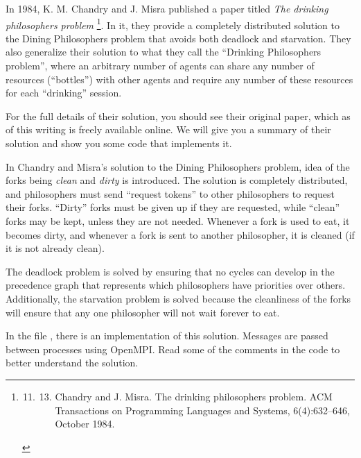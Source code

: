 \documentclass[letterpaper,10pt,openany,oneside]{sphinxmanual}
\begin{document}
In 1984, K. M. Chandry and J. Misra published a paper titled
\emph{The drinking philosophers problem} \footnote{\begin{enumerate}
\setcounter{enumi}{10}
\item {} \begin{enumerate}
\setcounter{enumi}{12}
\item {} 
Chandry and J. Misra. The drinking philosophers problem. ACM Transactions on Programming Languages and Systems, 6(4):632–646, October 1984.

\end{enumerate}

\end{enumerate}
}. In it, they
provide a completely distributed solution to the Dining
Philosophers problem that avoids both deadlock and starvation. They
also generalize their solution to what they call the
``Drinking Philosophers problem'', where an arbitrary number of
agents can share any number of resources (``bottles'') with other
agents and require any number of these resources for each
``drinking'' session.

For the full details of their solution, you should see their
original paper, which as of this writing is freely available
online. We will give you a summary of their solution and show you
some code that implements it.

In Chandry and Misra's solution to the Dining Philosophers problem,
idea of the forks being \emph{clean} and \emph{dirty} is introduced. The
solution is completely distributed, and philosophers must send
``request tokens'' to other philosophers to request their forks.
``Dirty'' forks must be given up if they are requested, while ``clean''
forks may be kept, unless they are not needed. Whenever a fork is
used to eat, it becomes dirty, and whenever a fork is sent to
another philosopher, it is cleaned (if it is not already clean).

The deadlock problem is solved by ensuring that no cycles can
develop in the precedence graph that represents which philosophers
have priorities over others. Additionally, the starvation problem
is solved because the cleanliness of the forks will ensure that any
one philosopher will not wait forever to eat.

In the file , there is an implementation of
this solution. Messages are passed between processes using OpenMPI.
Read some of the comments in the code to better understand the
solution.
\end{document}

